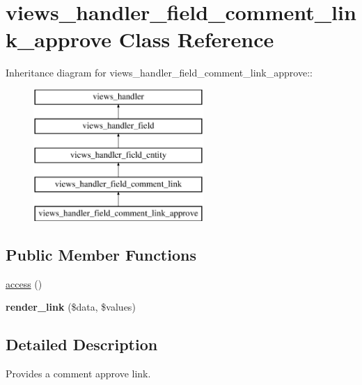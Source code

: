 \hypertarget{classviews__handler__field__comment__link__approve}{
\section{views\_\-handler\_\-field\_\-comment\_\-link\_\-approve Class Reference}
\label{classviews__handler__field__comment__link__approve}
}
Inheritance diagram for views\_\-handler\_\-field\_\-comment\_\-link\_\-approve::\begin{figure}[H]
\begin{center}
\leavevmode
\includegraphics[height=5cm]{classviews__handler__field__comment__link__approve}
\end{center}
\end{figure}
\subsection*{Public Member Functions}
\begin{DoxyCompactItemize}
\item 
\hyperlink{classviews__handler__field__comment__link__approve_aa6f8bce989b5c5dacce1d2390263a59a}{access} ()
\item 
\hypertarget{classviews__handler__field__comment__link__approve_a35f914ac7281e7af6a3b18981023feb5}{
{\bfseries render\_\-link} (\$data, \$values)}
\label{classviews__handler__field__comment__link__approve_a35f914ac7281e7af6a3b18981023feb5}

\end{DoxyCompactItemize}


\subsection{Detailed Description}
Provides a comment approve link. 

